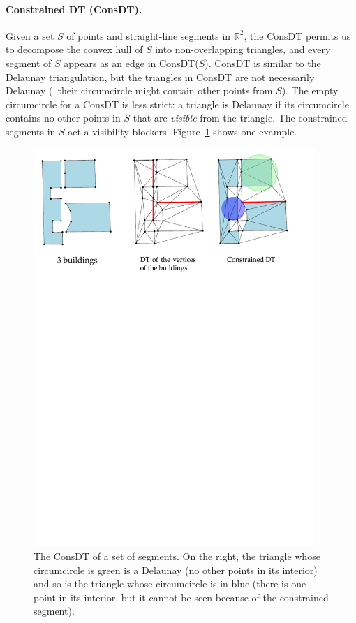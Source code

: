 \paragraph*{Constrained DT (ConsDT).}
Given a set $S$ of points and straight-line segments in $\mathbb{R}^2$, the ConsDT permits us to decompose the convex hull of $S$ into non-overlapping triangles, and every segment of $S$ appears as an edge in ConsDT($S$). 
ConsDT is similar to the Delaunay triangulation, but the triangles in ConsDT are not necessarily Delaunay (\ie\ their circumcircle might contain other points from $S$). 
The empty circumcircle for a ConsDT is less strict: a triangle is Delaunay if its circumcircle contains no other points in $S$ that are \emph{visible} from the triangle.
The constrained segments in $S$ act a visibility blockers. 
Figure~\ref{fig:cdt_buildings} shows one example.
\begin{figure}
  \centering
  \includegraphics[width=0.95\textwidth]{figs/cdtbuildings}
  \caption{The ConsDT of a set of segments. On the right, the triangle whose circumcircle is green is a Delaunay (no other points in its interior) and so is the triangle whose circumcircle is in blue (there is one point in its interior, but it cannot be seen because of the constrained segment).}
\label{fig:cdt_buildings}
\end{figure}

